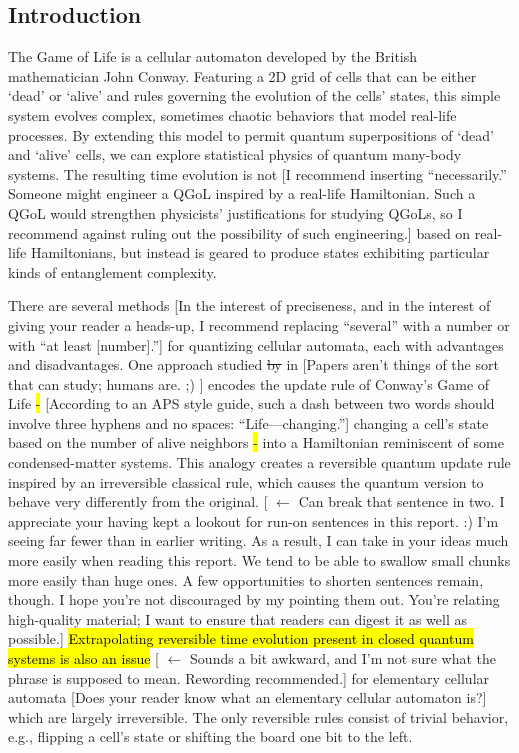 \documentclass[11pt]{article}
\newcommand{\nicole}[1]{{\color{Green}#1}}
\begin{document}
\begin{multicols}{2}

\section*{Introduction}
The Game of Life is a cellular automaton developed by the British mathematician John Conway. Featuring a 2D grid of cells that can be either `dead' or `alive' and rules governing the evolution of the cells' states, this simple system evolves complex, sometimes chaotic behaviors that model real-life processes. By extending this model to permit quantum superpositions of `dead' and `alive' cells, we can explore statistical physics of quantum many-body systems. The resulting time evolution is not 
\nicole{[I recommend inserting ``necessarily.'' Someone might engineer a QGoL inspired by a real-life Hamiltonian. Such a QGoL would strengthen physicists' justifications for studying QGoLs, so I recommend against ruling out the possibility of such engineering.]}
based on real-life Hamiltonians, but instead is geared to produce states exhibiting particular kinds of entanglement complexity. 

There are several methods \nicole{[In the interest of preciseness, and in the interest of giving your reader a heads-up, I recommend replacing ``several'' with a number or with ``at least [number].'']} 
for quantizing cellular automata, each with advantages and disadvantages. 
One approach studied \sout{by} \nicole{in [Papers aren't things of the sort that can study; humans are. ;) ]} \cite{Bleh} encodes the update rule of Conway's Game of Life \hl{-} 
\nicole{[According to an APS style guide, such a dash between two words should involve three hyphens and no spaces: ``Life---changing.'']}
changing a cell's state based on the number of alive neighbors \hl{-} into 
a Hamiltonian reminiscent of some condensed\nicole{-}matter systems. 
This analogy creates a reversible quantum update rule inspired by an irreversible classical rule, which causes the quantum version to behave very differently from the original. 
\nicole{[ $\leftarrow$ Can break that sentence in two. I appreciate your having kept a lookout for run-on sentences in this report. :) I'm seeing far fewer than in earlier writing. As a result, I can take in your ideas much more easily when reading this report. We tend to be able to swallow small chunks more easily than huge ones. A few opportunities to shorten sentences remain, though. I hope you're not discouraged by my pointing them out. You're relating high-quality material; I want to ensure that readers can digest it as well as possible.]}
\hl{Extrapolating reversible time evolution present in closed quantum systems is also an issue} 
\nicole{[ $\leftarrow$ Sounds a bit awkward, and I'm not sure what the phrase is supposed to mean. Rewording recommended.]}
for elementary cellular automata 
\nicole{[Does your reader know what an elementary cellular automaton is?]}
which are largely irreversible. The only reversible rules consist of trivial behavior, e.g.\nicole{,} flipping a cell's state or shifting the board one bit to the left.  


\end{multicols}
\end{document}
